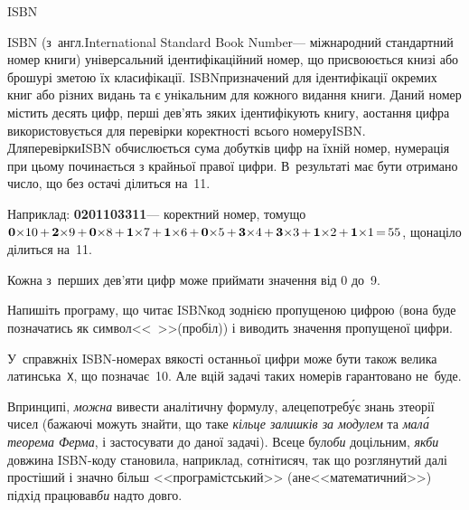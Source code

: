 \documentclass[14pt,a4paper]{extarticle}
\def\dib#1{\,#1\discretionary{}{\mbox{$#1$}}{}\,}
\begin{document}
\vspace{-0.5\baselineskip minus 1cm}
\begin{problemAllDefault}{ISBN}

ISBN (з~англ.\nolinebreak[2] International Standard Book Number\nolinebreak[3] --- міжнародний стандартний номер книги) універсальний ідентифікаційний номер, що присвоюється книзі або брошурі з\nolinebreak[3] метою їх класифікації. ISBN\nolinebreak[3] призначений для ідентифікації окремих книг або різних видань та є унікальним для кожного видання книги. Даний номер містить десять цифр, перші дев'ять з\nolinebreak[3] яких ідентифікують книгу, а\nolinebreak[3] остання цифра використовується для перевірки коректності всього номеру\nolinebreak[3] ISBN. Для\nolinebreak[3] перевірки\nolinebreak[3] ISBN обчислюється сума добутків цифр на їхній номер, нумерація при цьому починається з крайньої правої цифри. В~результаті має бути отримано число, що без остачі ділиться на~11.

Наприклад: \textbf{0201103311}\nolinebreak[3] --- коректний номер, тому\nolinebreak[3] що ${\mathbf{0}{\*}10}\dib{{+}}{\mathbf{2}{\*}9}\dib{{+}}{\mathbf{0}{\*}8}\dib{{+}}{\mathbf{1}{\*}7}\dib{{+}}{\mathbf{1}{\*}6}\dib{{+}}{\mathbf{0}{\*}5}\dib{{+}}{\mathbf{3}{\*}4}\dib{{+}}{\mathbf{3}{\*}3}\dib{{+}}{\mathbf{1}{\*}2}\dib{{+}}{\mathbf{1}{\*}1}\dib{{=}}55$, що\nolinebreak[3] націло ділиться на~11.

Кожна з~перших дев'яти цифр може приймати значення від 0 до~9. 

Напишіть програму, що читає ISBN\nolinebreak[2] код з\nolinebreak[3] однією пропущеною цифрою (вона буде позначатись як символ\nolinebreak[2] <<~>>\nolinebreak[3] (пробіл)) і виводить значення пропущеної цифри.


\Example
\begin{exampleSimple}{5em}{3em}%
%
\end{exampleSimple}

\Note	У~справжніх ISBN-номерах в\nolinebreak[3] якості останньої цифри може бути також велика латинська~\texttt{X}, що позначає~10. Але в\nolinebreak[3] цій задачі таких номерів гарантовано не~буде.

\end{problemAllDefault}
	

\Tutorial	В\nolinebreak[3] принципі, \emph{можна} вивести аналітичну формулу, але\nolinebreak[2] це\nolinebreak[1] потреб\'{у}є знань з\nolinebreak[3] теорії чисел (бажаючі можуть знайти, що таке \emph{кільце залишків за модулем} та \emph{мал\'{а} теорема Ферма}, і застосувати до даної задачі). Все\nolinebreak[3] це було\nolinebreak[3] \emph{би} доцільним, \emph{якби} довжина ISBN-коду становила, наприклад, \mbox{сотні}\nolinebreak[1] \mbox{тисяч}, так що розглянутий далі простіший і значно більш <<програмістський>> (а\nolinebreak[3] не\nolinebreak[3] <<математичний>>) підхід працював\nolinebreak[3] \emph{би} надто довго.
\end{document}
